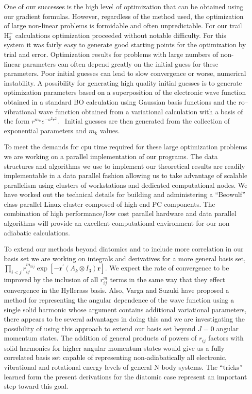 \documentclass[12pt]{article}
\begin{document}
One of our successes is the high level of optimization that can be obtained
using our gradient formulas. However, regardless of the method used, the
optimization of large non-linear problems is formidable and often
unpredictable. For our trail H$_{2}^{+}$ calculations optimization proceeded
without notable difficulty. For this system it was fairly easy to generate
good starting points for the optimization by trial and error. Optimization
results for problems with large numbers of non-linear parameters can often
depend greatly on the initial guess for these parameters. Poor initial guesses
can lead to slow convergence or worse, numerical instability. A possibility
for generating high quality initial guesses is to generate optimization
parameters based on a superposition of the electronic wave function obtained
in a standard BO calculation using Gaussian basis functions and the
ro--vibrational wave function obtained from a variational calculation with a
basis of the form\cite{Kinghorn97b} $r^{m_{k}}e^{-a^{2}r^{2}}$. \ Initial
guesses are then generated from the collection of exponential parameters and
$m_{k}$ values.

To meet the demands for cpu time required for these large optimization
problems we are working on a parallel implementation of our programs. The data
structures and algorithms we use to implement our theoretical results are
readily implementable in a data parallel fashion allowing us to take advantage
of scalable parallelism using clusters of workstations and dedicated
computational nodes. We have worked out the technical details for building and
administering a ``Beowulf''\cite{beowulfwww} class parallel Linux cluster
composed of high end PC components. The combination of high performance/low
cost parallel hardware and data parallel algorithms will provide an excellent
computational environment for our non-adiabatic calculations.

To extend our methods beyond diatomics and to include more correlation in our
basis set we are working on integrals and derivatives for a more general basis
set, $\prod_{i<j}r_{ij}^{m_{kij}}\exp\left[  -\mathbf{r}^{\prime}(A_{k}\otimes
I_{3})\mathbf{r}\right]  .$ We expect the rate of convergence to be improved
by the inclusion of all $r_{ij}^{m}$ terms in the same way that they effect
convergence in the Hyllerass basis. Also, Varga and Suzuki\cite{Varga95} have
proposed a method for representing the angular dependence of the wave function
using a single solid harmonic whose argument contains additional variational
parameters, there appears to be several advantages in doing this and we are
investigating the possibility of using this approach to extend our basis set
beyond $J=0$ angular momentum states. The addition of general products of
powers of $r_{ij}$ factors with solid harmonics for higher angular momentum
states would give us a fully correlated basis set capable of representing
non-adiabatically all electronic, vibrational and rotational energy levels of
general N-body systems. The ``tricks'' learned form the present derivations
for the diatomic case represent an important step toward this goal.
\end{document}
